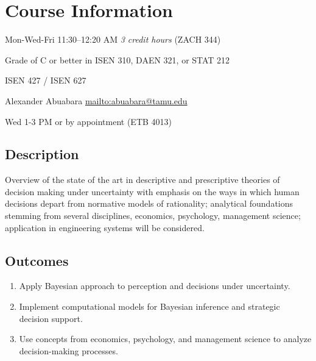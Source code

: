 \documentclass[10pt]{article}
\begin{document}
\title{}
\author{} %
\date{}
\maketitle
\vspace{-7.5em}

\section*{Course Information}
\begin{description}[nosep,leftmargin=0.5in]
\item[Time (Location)] Mon-Wed-Fri 11:30--12:20 AM \emph{3 credit hours} (ZACH 344)
\item[Prerequisites] Grade of C or better in ISEN 310, DAEN 321, or STAT 212
\item[Cross listing] ISEN 427 / ISEN 627
\item[Instructor] Alexander Abuabara \url{mailto:abuabara@tamu.edu}
\item[Course office hours (location)] Wed 1-3 PM or by appointment (ETB 4013)
\end{description}

\subsection*{Description}
Overview of the state of the art in descriptive and prescriptive theories 
of decision making under uncertainty with emphasis on the ways in which human 
decisions depart from normative models of rationality; analytical foundations 
stemming from several disciplines, economics, psychology, management science; 
application in engineering systems will be considered.

\subsection*{Outcomes}
\begin{enumerate}[leftmargin=*,nosep]
\item Apply Bayesian approach to perception and decisions under uncertainty.
\item Implement computational models for Bayesian inference and strategic decision support.
\item Use concepts from economics, psychology, and management science to analyze decision-making processes.
\end{enumerate}
\end{document}
